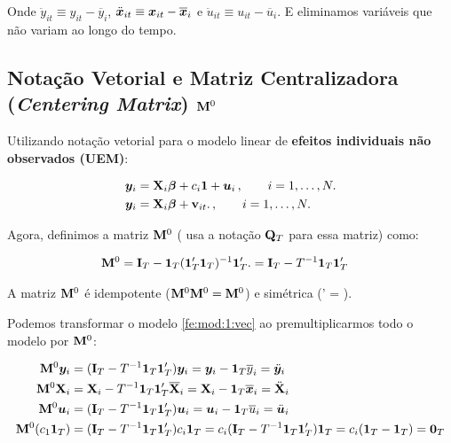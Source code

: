 \documentclass[11pt, oneside, a4paper, article]{article}
\numberwithin{equation}{section}
\begin{document}
\noindent
Onde 
$\ddot{y}_{it} \equiv y_{it} - \overline{y}_{i}$, 
$\ddot{\boldsymbol{x}}_{it} \equiv \boldsymbol{x}_{it} - \overline{\boldsymbol{x}}_{i}$ e
$\ddot{u}_{it} \equiv u_{it} - \overline{u}_{i}$.
E eliminamos variáveis que não variam ao longo do tempo.

\subsection{Notação Vetorial e Matriz Centralizadora (\textit{Centering Matrix}) $\mathbf{M}^{0}$}

Utilizando notação vetorial para o modelo linear de \textbf{efeitos individuais não observados (UEM)}:

\vspace{-1 em}
\begin{align} \label{fe:mod:1:vec}
\boldsymbol{y}_{i} &= \mathbf{X}_{i} \boldsymbol{\beta} + c_{i} \boldsymbol{1} + \boldsymbol{u}_{i} 
\, , \qquad	i = 1, \dots, N.
\\
\label{fe:mod:2:vec}
\boldsymbol{y}_{i} &= \mathbf{X}_{i} \boldsymbol{\beta} + \mathbf{v}_{it}.
\, , \qquad	i = 1, \dots, N.
\end{align}

\noindent
Agora, definimos a matriz $\mathbf{M}^{0}$ (\citet[p. 268]{wool-2010} usa a notação $\mathbf{Q}_{T}$ para essa matriz) como:

\vspace{-1 em}
\begin{align*}
	\mathbf{M}^{0} &=
	\mathbf{I}_{T} - \boldsymbol{1}_{T} (\boldsymbol{1}_{T}' \boldsymbol{1}_{T})^{-1} \boldsymbol{1}_{T}'.
	=
	\mathbf{I}_{T} - T^{-1} \boldsymbol{1}_{T} \boldsymbol{1}_{T}'
\end{align*}

\noindent
A matriz $\mathbf{M}^{0}$ é idempotente ($\mathbf{M}^{0} \mathbf{M}^{0} = \mathbf{M}^{0}$) e simétrica (\Mzero' = \Mzero).

\vspace{1 em}
Podemos transformar o modelo \eqref{fe:mod:1:vec} ao premultiplicarmos todo o modelo por $\mathbf{M}^{0}$:

\vspace{-1 em}
\begin{align*} 
\mathbf{M}^{0} \boldsymbol{y}_{i} &= ( \mathbf{I}_{T} - T^{-1} \boldsymbol{1}_{T} \boldsymbol{1}_{T}')\boldsymbol{y}_{i}	= \boldsymbol{y}_{i} - \boldsymbol{1}_{T} \overline{y}_{i} = \ddot{\boldsymbol{y}}_{i}
\\
\mathbf{M}^{0} \mathbf{X}_{i} &=
\mathbf{X}_{i} - T^{-1} \boldsymbol{1}_{T} \boldsymbol{1}_{T}' \overline{\mathbf{X}}_{i} =
\mathbf{X}_{i} - \boldsymbol{1}_{T} \overline{\boldsymbol{x}}_{i} =
\ddot{\mathbf{X}}_{i}
\\
\mathbf{M}^{0} \boldsymbol{u}_{i} &= ( \mathbf{I}_{T} - T^{-1} \boldsymbol{1}_{T} \boldsymbol{1}_{T}')\boldsymbol{u}_{i}	= \boldsymbol{u}_{i} - \boldsymbol{1}_{T} \overline{u}_{i} = \ddot{\boldsymbol{u}}_{i}
\\
\mathbf{M}^{0} ( c_{1} \boldsymbol{1}_{T} ) &= 
( \mathbf{I}_{T} - T^{-1} \boldsymbol{1}_{T} \boldsymbol{1}_{T}' ) c_{i} \boldsymbol{1}_{T} =
c_{i}( \mathbf{I}_{T} - T^{-1} \boldsymbol{1}_{T} \boldsymbol{1}_{T}' ) \boldsymbol{1}_{T} =
c_{i}( \boldsymbol{1}_{T} - \boldsymbol{1}_{T} ) = \boldsymbol{0}_{T}
\end{align*}
\end{document}
